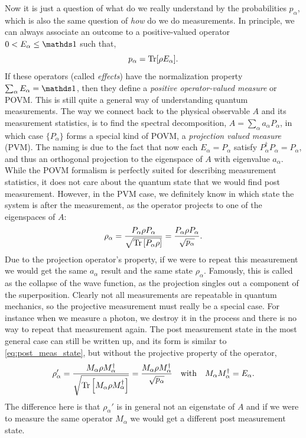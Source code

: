 Now it is just a question of what do we really understand by the probabilities $p_\alpha$, which is also the same question of \textit{how} do we do measurements. In principle, we can always associate an outcome to a positive-valued operator $0 < E_\alpha \leq \idm$ such that,
$$p_\alpha = \operatorname{Tr} [\rho E_\alpha].$$ 
If these operators (called \textit{effects}) have the normalization property $\sum_\alpha E_\alpha = \idm$, then they define a \textit{positive operator-valued measure} or POVM. This is still quite a general way of understanding quantum measurements. The way we connect back to the physical observable $A$ and its measurement statistics, is to find the spectral decomposition, $A = \sum_\alpha a_\alpha P_\alpha$, in which case $\{P_\alpha\}$ forms a special kind of POVM, a \textit{projection valued measure} (PVM). The naming is due to the fact that now each $E_\alpha = P_\alpha$ satisfy $P_\alpha^\dagger P_\alpha =  P_\alpha$, and thus an orthogonal projection to the eigenspace of $A$ with eigenvalue $a_\alpha$. While the POVM formalism is perfectly suited for describing measurement statistics, it does not care about the quantum state that we would find post measurement. However, in the PVM case, we definitely know in which state the system is after the measurement, as the operator projects to one of the eigenspaces of $A$:
\begin{equation}
    \label{eq:post_meas_state}
    \rho_\alpha = \frac{P_\alpha\rho P_\alpha}{\sqrt{\operatorname{Tr}{\left[P_\alpha \rho\right]}}} = \frac{P_\alpha\rho P_\alpha}{\sqrt{p_\alpha}}.
\end{equation}
Due to the projection operator's property, if we were to repeat this measurement we would get the same $a_\alpha$ result and the same state $\rho_\alpha$. Famously, this is called as the collapse of the wave function, as the projection singles out a component of the superposition. Clearly not all measurements are repeatable in quantum mechanics, so the projective measurement must really be a special case. For instance when we measure a photon, we destroy it in the process and there is no way to repeat that measurement again. The post measurement state in the most general case can still be written up, and its form is similar to \eqref{eq:post_meas_state}, but without the projective property of the operator,
\begin{equation}
    \label{eq:post_meas_state_general}
    \rho_\alpha' = \frac{M_\alpha \rho M_\alpha^\dagger}{\sqrt{\operatorname{Tr}\left[M_\alpha \rho M_\alpha^\dagger\right]}} = \frac{M_\alpha \rho M_\alpha^\dagger}{\sqrt{p_\alpha}}\quad\text{with}\quad M_\alpha M_\alpha^\dagger = E_\alpha.
\end{equation}
The difference here is that $\rho_\alpha'$ is in general not an eigenstate of $A$ and if we were to measure the same operator $M_\alpha$ we would get a different post measurement state.

